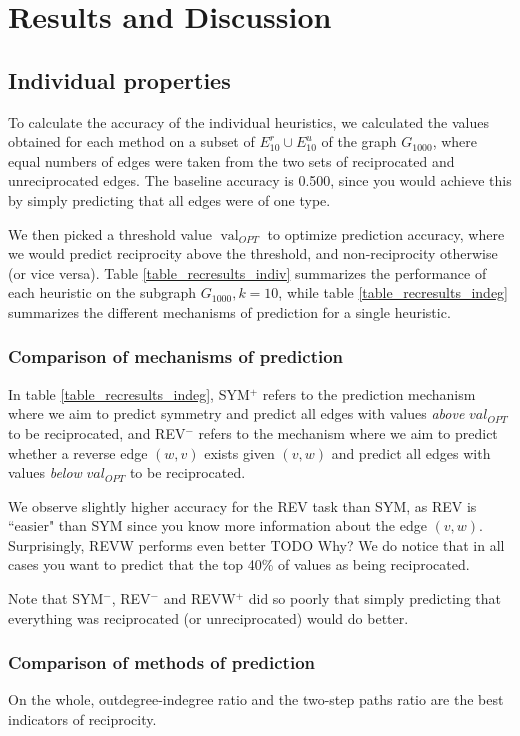 \documentclass[conference]{IEEEtran}
\begin{document}
\section{Results and Discussion}

\subsection{Individual properties}
To calculate the accuracy of the individual heuristics, we calculated the values obtained for each method on a subset of $E_{10}^r \cup E_{10}^u$ of the graph $G_{1000}$, where equal numbers of edges were taken from the two sets of reciprocated and unreciprocated edges. The baseline accuracy is 0.500, since you would achieve this by simply predicting that all edges were of one type.

We then picked a threshold value $\operatorname{val}_{OPT}$ to optimize prediction accuracy, where we would predict reciprocity above the threshold, and non-reciprocity otherwise (or vice versa). Table \ref{table_recresults_indiv} summarizes the performance of each heuristic on the subgraph $G_{1000}, k=10$, while table \ref{table_recresults_indeg} summarizes the different mechanisms of prediction for a single heuristic. 

\subsubsection{Comparison of mechanisms of prediction}

In table \ref{table_recresults_indeg}, SYM$^+$ refers to the prediction mechanism where we aim to predict symmetry and predict all edges with values \emph{above} $val_{OPT}$ to be reciprocated, and REV$^-$ refers to the mechanism where we aim to predict whether a reverse edge $(w,v)$ exists given $(v,w)$ and predict all edges with values \emph{below} $val_{OPT}$ to be reciprocated. 

We observe slightly higher accuracy for the REV task than SYM, as REV is ``easier" than SYM since you know more information about the edge $(v,w)$. Surprisingly, REVW performs even better TODO Why? We do notice that in all cases you want to predict that the top 40\% of values as being reciprocated. 

Note that SYM$^-$, REV$^-$ and REVW$^+$ did so poorly that simply predicting that everything was reciprocated (or unreciprocated) would do better.

\subsubsection{Comparison of methods of prediction}
On the whole, outdegree-indegree ratio and the two-step paths ratio are the best indicators of reciprocity.
\end{document}
